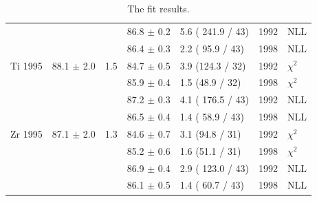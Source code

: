 \begin{table}[H]
\begin{center}
\begin{tabular}{|l||l|l|l|l|l|l|}
                &                &     & 86.8 $\pm$ 0.2 & 5.6 ( 241.9 / 43) & 1992 & NLL \\
                &                &     & 86.4 $\pm$ 0.3 & 2.2 ( 95.9 / 43) & 1998 & NLL \\
      \hline                           
       Ti 1995   & 88.1 $\pm$ 2.0 & 1.5 & 84.7 $\pm$ 0.5 & 3.9 (124.3 / 32) & 1992 & $\chi^2$ \\  
                 &                &     & 85.9 $\pm$ 0.4 & 1.5 (48.9 / 32)  & 1998 & $\chi^2$ \\  
                                         
                &                &     & 87.2 $\pm$ 0.3 & 4.1 ( 176.5 / 43) & 1992 & NLL \\
                &                &     & 86.5 $\pm$ 0.4 & 1.4 ( 58.9 / 43) & 1998 & NLL \\
      \hline                           
       Zr 1995   & 87.1 $\pm$ 2.0 & 1.3 & 84.6 $\pm$ 0.7 & 3.1 (94.8 / 31)  & 1992 & $\chi^2$ \\  
                 &                &     & 85.2 $\pm$ 0.6 & 1.6 (51.1 / 31)  & 1998 & $\chi^2$ \\  
              
                &                &     & 86.9 $\pm$ 0.4 & 2.9 ( 123.0 / 43) & 1992 & NLL \\
                &                &     & 86.1 $\pm$ 0.5 & 1.4 ( 60.7 / 43) & 1998 & NLL \\
      \hline
                                                                                
    \end{tabular}
  \end{center}
  \caption{The fit results.}
  \label{table:fits1995}
\end{table}

